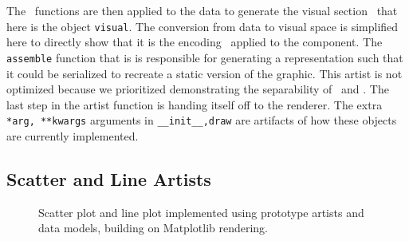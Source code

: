 \documentclass[journal]{vgtc}                %
\begin{document}
 The \vchannel\ functions are then applied to the data to generate the visual section \vsection\ that here is the object \texttt{visual}. The conversion from data to visual space is simplified here to directly show that it is the encoding \vchannel\ applied to the component. The \texttt{assemble} function that is \vmarkd is responsible for generating a representation such that it could be serialized to recreate a static version of the graphic. This artist is not optimized because we prioritized demonstrating the separability of \vchannel\ and \vmarkd. The last step in the artist function is handing itself off to the renderer. The extra \texttt{*arg, **kwargs} arguments in \texttt{__init__,draw} are artifacts of how these objects are currently implemented.

 \subsection{Scatter and Line Artists}
 \begin{figure}[H]
    \centering 
  \caption{Scatter plot and line plot implemented using prototype artists and data models, building on Matplotlib rendering.}
  \label{fig:code_scatter_line}
\end{figure}
\end{document}
